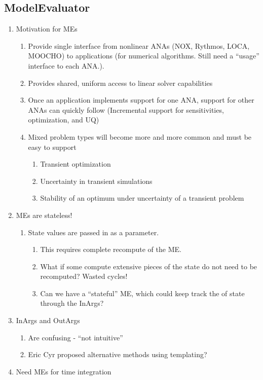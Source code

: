 \subsection{ModelEvaluator}
\begin{enumerate}
\item Motivation for MEs

\begin{enumerate}
\item Provide single interface from nonlinear ANAs (NOX, Rythmos, LOCA,
MOOCHO) to applications (for numerical algorithms. Still need a ``usage''
interface to each ANA.).
\item Provides shared, uniform access to linear solver capabilities 
\item Once an application implements support for one ANA, support for other
ANAs can quickly follow (Incremental support for sensitivities, optimization,
and UQ)
\item Mixed problem types will become more and more common and must be easy
to support

\begin{enumerate}
\item Transient optimization
\item Uncertainty in transient simulations 
\item Stability of an optimum under uncertainty of a transient problem 
\end{enumerate}
\end{enumerate}
\item MEs are stateless!

\begin{enumerate}
\item State values are passed in as a parameter.

\begin{enumerate}
\item This requires complete recompute of the ME.
\item What if some compute extensive pieces of the state do not need to
be recomputed? Wasted cycles!
\item Can we have a ``stateful'' ME, which could keep track the of state
through the InArgs?
\end{enumerate}
\end{enumerate}
\item InArgs and OutArgs

\begin{enumerate}
\item Are confusing - ``not intuitive''
\item Eric Cyr proposed alternative methods using templating?
\end{enumerate}
\item Need MEs for time integration


\end{enumerate}
